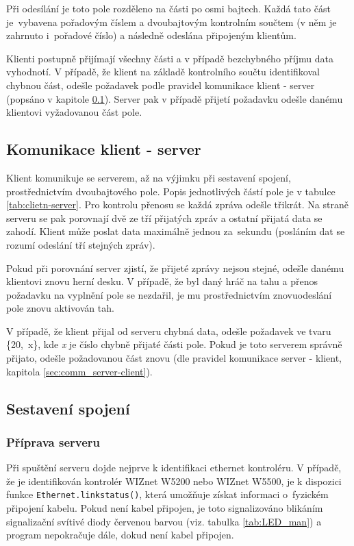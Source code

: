Při odesílání je toto pole rozděleno na části po osmi bajtech. Každá tato část je~vybavena pořadovým číslem a dvoubajtovým kontrolním součtem (v něm je zahrnuto i~pořadové číslo) a následně odeslána připojeným klientům.

Klienti postupně přijímají všechny části a v případě bezchybného příjmu data vyhodnotí. V případě, že klient na základě kontrolního součtu identifikoval chybnou část, odešle požadavek podle pravidel komunikace klient - server (popsáno v kapitole \ref{sec:comm_client-server}). Server pak v případě přijetí požadavku odešle danému klientovi vyžadovanou část pole.


\subsection{Komunikace klient - server}
\label{sec:comm_client-server}
Klient komunikuje se serverem, až na výjimku při sestavení spojení, prostřednictvím dvoubajtového pole. Popis jednotlivých částí pole je v tabulce \ref{tab:clietn-server}. Pro kontrolu přenosu se každá zpráva odešle třikrát. Na straně serveru se pak porovnají dvě ze tří přijatých zpráv a ostatní přijatá data se zahodí. Klient může poslat data maximálně jednou za~sekundu (posláním dat se rozumí odeslání tří stejných zpráv).

Pokud při porovnání server zjistí, že přijeté zprávy nejsou stejné, odešle danému klientovi znovu herní desku. V případě, že byl daný hráč na tahu a přenos požadavku na vyplnění pole se nezdařil, je mu prostřednictvím znovuodeslání pole znovu aktivován tah.

V případě, že klient přijal od serveru chybná data, odešle požadavek ve tvaru \mbox{\{20, x\}}, kde \textit{x} je číslo chybně přijaté části pole. Pokud je toto serverem správně přijato, odešle požadovanou část znovu (dle pravidel komunikace server - klient, kapitola \ref{sec:comm_server-client}).





\newpage
\subsection{Sestavení spojení}
\subsubsection{Příprava serveru}
Při spuštění serveru dojde nejprve k identifikaci ethernet kontroléru. V případě, že je identifikován kontrolér WIZnet W5200 nebo WIZnet W5500, je k dispozici funkce \texttt{Ethernet.linkstatus()}, která umožňuje získat informaci o~fyzickém připojení kabelu. Pokud není kabel připojen, je toto signalizováno blikáním signalizační svítivé diody červenou barvou (viz. tabulka \ref{tab:LED_man}) a program nepokračuje dále, dokud není kabel připojen.

